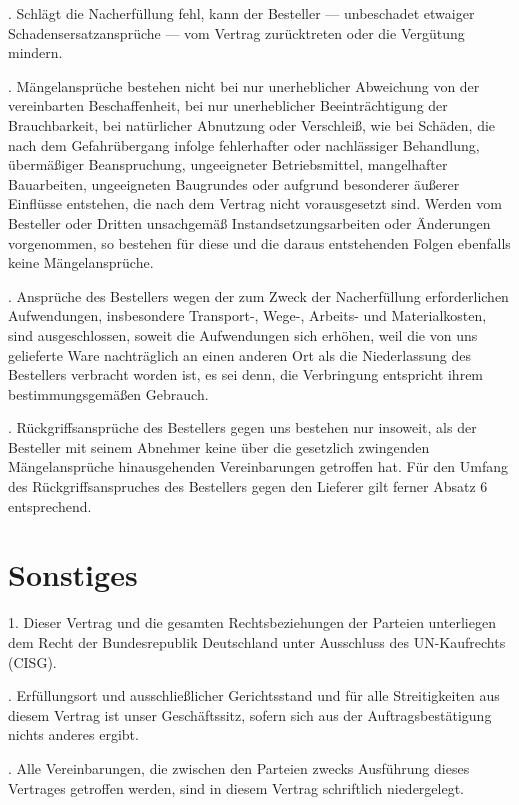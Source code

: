\documentclass[a4paper, final, 12pt, oneside]{scrartcl}
\numberwithin{equation}{section}
\numberwithin{table}{section}
\numberwithin{figure}{section}
\begin{document}
\begin{multicols}{2}
. Schlägt die Nacherfüllung fehl, kann der Besteller — unbeschadet etwaiger
Schadensersatzansprüche — vom Vertrag zurücktreten oder die Vergütung mindern.

. Mängelansprüche bestehen nicht bei nur unerheblicher Abweichung von der
vereinbarten Beschaffenheit, bei nur unerheblicher Beeinträchtigung der
Brauchbarkeit, bei natürlicher Abnutzung oder Verschleiß, wie bei Schäden,
die nach dem Gefahrübergang infolge fehlerhafter oder nachlässiger Behandlung,
übermäßiger Beanspruchung, ungeeigneter Betriebsmittel, mangelhafter
Bauarbeiten, ungeeigneten Baugrundes oder aufgrund besonderer äußerer Einflüsse
entstehen, die nach dem Vertrag nicht vorausgesetzt sind. Werden vom Besteller
oder Dritten unsachgemäß Instandsetzungsarbeiten oder Änderungen vorgenommen,
so bestehen für diese und die daraus entstehenden Folgen ebenfalls keine
Mängelansprüche.

. Ansprüche des Bestellers wegen der zum Zweck der Nacherfüllung erforderlichen
Aufwendungen, insbesondere Transport-, Wege-, Arbeits- und Materialkosten, sind
ausgeschlossen, soweit die Aufwendungen sich erhöhen, weil die von uns gelieferte
Ware nachträglich an einen anderen Ort als die Niederlassung des Bestellers
verbracht worden ist, es sei denn, die Verbringung entspricht ihrem
bestimmungsgemäßen Gebrauch.

. Rückgriffsansprüche des Bestellers gegen uns bestehen nur insoweit, als
der Besteller mit seinem Abnehmer keine über die gesetzlich zwingenden
Mängelansprüche hinausgehenden Vereinbarungen getroffen hat. Für den Umfang
des Rückgriffsanspruches des Bestellers gegen den Lieferer gilt ferner Absatz
6 entsprechend.

\section{Sonstiges}
1. Dieser Vertrag und die gesamten Rechtsbeziehungen der Parteien
unterliegen dem Recht der Bundesrepublik Deutschland unter Ausschluss
des UN-Kaufrechts (CISG).

. Erfüllungsort und ausschließlicher Gerichtsstand und für alle
Streitigkeiten aus diesem Vertrag ist unser Geschäftssitz, sofern
sich aus der Auftragsbestätigung nichts anderes ergibt.

. Alle Vereinbarungen, die zwischen den Parteien zwecks Ausführung
dieses Vertrages getroffen werden, sind in diesem Vertrag schriftlich
niedergelegt.



\end{multicols}
\end{document}
